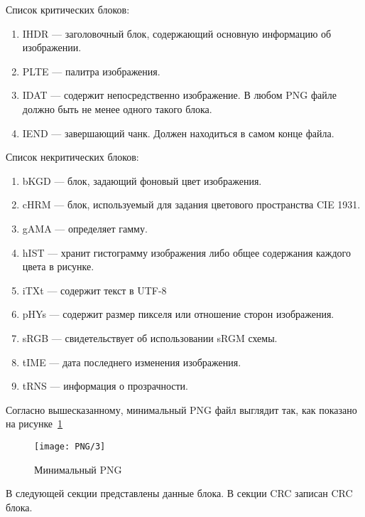 Список критических блоков:
\begin{enumerate}
    \item IHDR --- заголовочный блок, содержающий основную информацию об изображении.
    \item PLTE --- палитра изображения.
    \item IDAT --- содержит непосредственно изображение.
    В любом PNG файле должно быть не менее одного такого блока.
    \item IEND --- завершающий чанк. Должен находиться в самом конце файла.
\end{enumerate}

Список некритических блоков:
\begin{enumerate}
    \item bKGD --- блок, задающий фоновый цвет изображения.
    \item cHRM --- блок, используемый для задания цветового пространства CIE 1931.
    \item gAMA --- определяет гамму.
    \item hIST --- хранит гистограмму изображения либо общее содержания каждого цвета в рисунке.
    \item iTXt --- содержит текст в UTF-8
    \item pHYs --- содержит размер пикселя или отношение сторон изображения.
    \item sRGB --- свидетельствует об использовании sRGM схемы.
    \item tIME --- дата последнего изменения изображения.
    \item tRNS --- информация о прозрачности.
\end{enumerate}

Согласно вышесказанному, минимальный PNG файл выглядит так,
как показано на рисунке~\ref{img:png_3}

\begin{figure}[ht!]
    \caption{Минимальный PNG}
    \texttt{[image: PNG/3]}
    \centering
    \label{img:png_3}
\end{figure}

В следующей секции представлены данные блока.
В секции CRC записан CRC блока.

